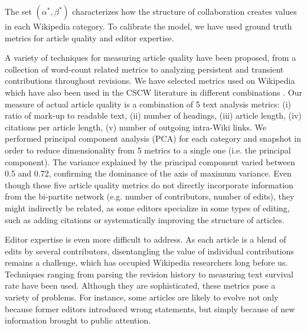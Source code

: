 The set $(\alpha^*,\beta^*)$ characterizes how the structure of collaboration creates values in each Wikipedia category. To calibrate the model, we have used ground truth metrics for article quality and editor expertise. 

A variety of techniques for measuring article quality have been proposed, from a collection of word-count related metrics \cite{blumenstock2008sizematters} to analyzing persistent and transient contributions throughout revisions\cite{woehner2009}. We have selected metrics used on Wikipedia \cite{wang2013tell,klein} which have also been used in the CSCW literature in different combinations \cite{kane2011,keegan2012}. Our measure of actual article quality is a combination of 5 text analysis metrics: (i) ratio of mark-up to readable text, (ii) number of headings, (iii) article length, (iv) citations per article length, (v) number of outgoing intra-Wiki links. We performed principal component analysis (PCA) for each category and snapshot in order to reduce dimensionality from 5 metrics to a single one (i.e. the principal component). The variance explained by the principal component varied between 0.5 and 0.72, confirming the dominance of the axis of maximum variance. Even though these five article quality metrics do not directly incorporate information from the bi-partite network (e.g. number of contributors, number of edits), they might indirectly be related, as some editors specialize in some types of editing, such as adding citations or systematically improving the structure of articles.

Editor expertise is even more difficult to address. As each article is a blend of edits by several contributors, disentangling the value of individual contributions remains a challenge, which has occupied Wikipedia researchers long before us. Techniques ranging from parsing the revision history to measuring text survival rate \cite{adler2008measuringauthor} have been used. Although they are sophisticated, these metrics pose a variety of problems. For instance, some articles are likely to evolve not only because former editors introduced wrong statements, but simply because of new information brought to public attention. 

